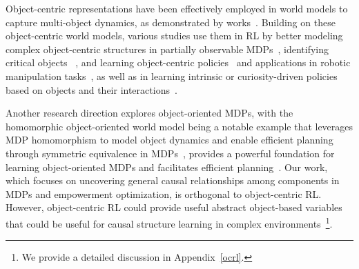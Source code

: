 Object-centric representations have been effectively employed in world models to capture multi-object dynamics, as demonstrated by works~\citep{jiang2019scalor,lin2020improving,kossen2019structured}. Building on these object-centric world models, various studies use them in RL by better modeling complex object-centric structures in partially observable MDPs~\citep{kossen2019structured, mambelli2022compositional, feng2023learning, choi2024unsupervised}, identifying critical objects ~\citep{zadaianchuk2022self, park2021object}, and learning object-centric policies~\citep{zadaianchuk2020self, yuan2022sornet} and applications in robotic manipulation tasks~\citep{li2020towards, mitash2024scaling, haramati2024entity, li2024manipllm}, as well as in learning intrinsic or curiosity-driven policies based on objects and their interactions~\citep{watters2019cobra, hu2023elden, wang2024skild}. 

Another research direction explores object-oriented MDPs, with the homomorphic object-oriented world model being a notable example that leverages MDP homomorphism to model object dynamics and enable efficient planning through symmetric equivalence in MDPs~\citep{diuk2008object, scholz2014physics, wandzel2019multi, van2020plannable, rezaei2022continuous, zhao2022toward}, provides a powerful foundation for learning object-oriented MDPs and facilitates efficient planning~\citep{wolfe2006defining}.   Our work, which focuses on uncovering general causal relationships among components in MDPs and empowerment optimization, is orthogonal to object-centric RL. However, object-centric RL could provide useful abstract object-based variables that could be useful for causal structure learning in complex environments~\footnote{We provide a detailed discussion in Appendix~\ref{ocrl}.}.

\vspace{-2mm}